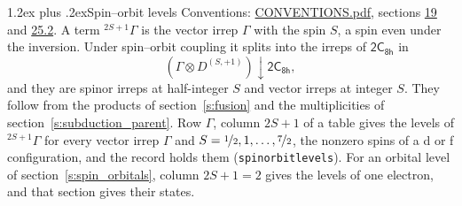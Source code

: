 \documentclass[10pt,a4paper]{article}
\makeatletter
\renewcommand\section{\@startsection{section}{1}{\z@}{-3ex plus -1ex minus -.2ex}%
  {1.2ex plus .2ex}{\normalfont\large\sffamily\bfseries\color{parttitle}}}
\numberwithin{equation}{section}
\newcommand{\grp}[1]{\mathsf{#1}}
\newcommand{\restr}[2]{#1\!\downarrow#2}
\newcommand{\irrJp}[2]{D^{(#1,#2)}}
\newcommand{\irrprod}{\otimes}
\newcommand{\term}[2]{{}^{#1}#2}
\makeatother
\begin{document}
\section{Spin--orbit levels}\label{s:spin_orbit}
Conventions: \href{../../CONVENTIONS.pdf}{CONVENTIONS.pdf}, sections \href{../../../rotation/CONVENTIONS.pdf\#conv.19}{19} and \href{../../CONVENTIONS.pdf\#conv.25.2}{25.2}.
\leavevmode\label{n:local.spin}\label{n:symbol.term}A term $\term{2S+1}{\Gamma}$ is the vector irrep $\Gamma$ with the spin $S$, a spin even under the inversion. Under spin--orbit coupling it splits into the irreps of $\grp{2C_{8h}}$ in
\begin{equation}\label{e:spinorbit}\restr{(\Gamma \irrprod \irrJp{S}{+1})}{\grp{2C_{8h}}},\end{equation}
and they are spinor irreps at half-integer $S$ and vector irreps at integer $S$. They follow from the products of section~\ref{s:fusion} and the multiplicities of section~\ref{s:subduction_parent}. Row $\Gamma$, column $2S + 1$ of a table gives the levels of $\term{2S+1}{\Gamma}$ for every vector irrep $\Gamma$ and $S = \nicefrac{1}{2}, 1, \dots, \nicefrac{7}{2}$, the nonzero spins of a d or f configuration, and the record holds them (\texttt{spinorbitlevels}). For an orbital level of section~\ref{s:spin_orbitals}, column $2S + 1 = 2$ gives the levels of one electron, and that section gives their states.
\end{document}
